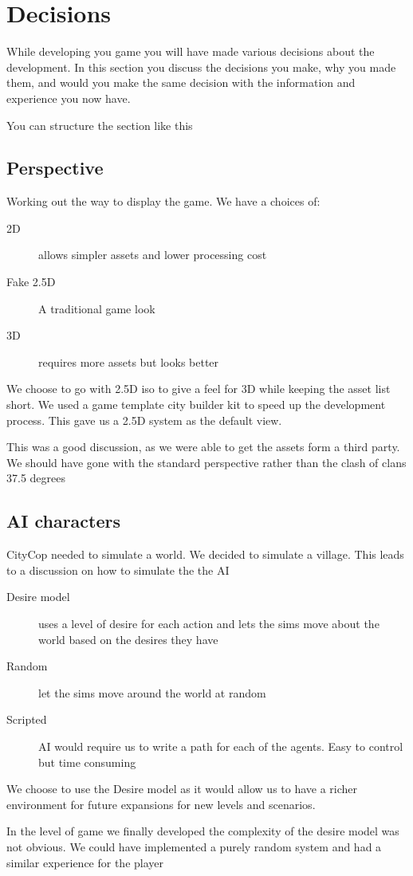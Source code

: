 \section{Decisions}

While developing you game you will have made various decisions about the development.  In this section you discuss the decisions you make, why you made them, and would you make the same decision with the information and experience you now have.

You can structure the section like this

\subsection{Perspective}
Working out the way to display the game.  We have a choices of:

\begin{description}
\item[2D] allows simpler assets and lower processing cost
\item[Fake 2.5D] A traditional game look 
\item[3D] requires more assets but looks better
\end{description}

We choose to go with 2.5D iso to give a feel for 3D while keeping the asset list short. We used a game template city builder kit to speed up the development process.  This gave us a 2.5D system as the default view. 

This was a good discussion, as we were able to get the assets form a third party.  We should have gone with the standard perspective rather than the clash of clans 37.5 degrees

\subsection{AI characters}
CityCop needed to simulate a world.  We decided to simulate a village.  This leads to a discussion on how to simulate the the AI

\begin{description}
\item[Desire model] uses a level of desire for each action and lets the sims move about the world based on the desires they have
\item[Random] let the sims move around the world at random 
\item[Scripted] AI would require us to write a path for each of the agents.  Easy to control but time consuming 
\end{description}

We choose to use the Desire model as it would allow us to have a richer environment for future expansions for new levels and scenarios.

In the level of game we finally developed the complexity of the desire model was not obvious.  We could have implemented a purely random system and had a similar experience for the player 


